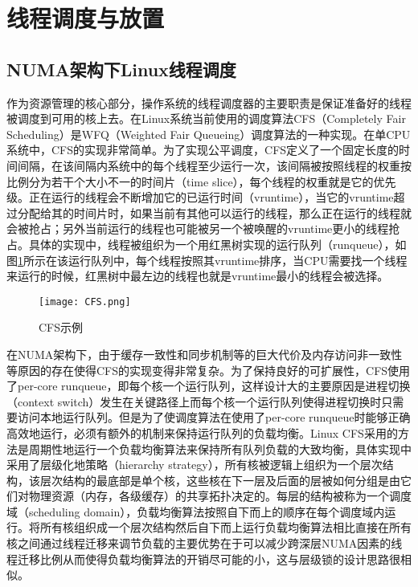 \section{线程调度与放置}
\subsection{NUMA架构下Linux线程调度}
作为资源管理的核心部分，操作系统的线程调度器的主要职责是保证准备好的线程被调度到可用的核上去。在Linux系统当前使用的调度算法CFS（Completely Fair Scheduling）\cite{lozi2016linux}是WFQ（Weighted Fair Queueing）调度算法的一种实现。在单CPU系统中，CFS的实现非常简单。为了实现公平调度，CFS定义了一个固定长度的时间间隔，在该间隔内系统中的每个线程至少运行一次，该间隔被按照线程的权重按比例分为若干个大小不一的时间片（time slice），每个线程的权重就是它的优先级。正在运行的线程会不断增加它的已运行时间（vruntime），当它的vruntime超过分配给其的时间片时，如果当前有其他可以运行的线程，那么正在运行的线程就会被抢占；另外当前运行的线程也可能被另一个被唤醒的vruntime更小的线程抢占。具体的实现中，线程被组织为一个用红黑树实现的运行队列（runqueue），如图\ref{Fig:CFS}所示在该运行队列中，每个线程按照其vruntime排序，当CPU需要找一个线程来运行的时候，红黑树中最左边的线程也就是vruntime最小的线程会被选择。

\begin{figure}[t]
	\centering
	\texttt{[image: CFS.png]}
	\caption{CFS示例}
	\label{Fig:CFS}
\end{figure}

在NUMA架构下，由于缓存一致性和同步机制等的巨大代价及内存访问非一致性等原因的存在使得CFS的实现变得非常复杂。为了保持良好的可扩展性，CFS使用了per-core runqueue，即每个核一个运行队列，这样设计大的主要原因是进程切换（context switch）发生在关键路径上而每个核一个运行队列使得进程切换时只需要访问本地运行队列。但是为了使调度算法在使用了per-core runqueue时能够正确高效地运行，必须有额外的机制来保持运行队列的负载均衡。Linux CFS采用的方法是周期性地运行一个负载均衡算法来保持所有队列负载的大致均衡，具体实现中采用了层级化地策略（hierarchy strategy），所有核被逻辑上组织为一个层次结构，该层次结构的最底部是单个核，这些核在下一层及后面的层被如何分组是由它们对物理资源（内存，各级缓存）的共享拓扑决定的。每层的结构被称为一个调度域（scheduling domain），负载均衡算法按照自下而上的顺序在每个调度域内运行。将所有核组织成一个层次结构然后自下而上运行负载均衡算法相比直接在所有核之间通过线程迁移来调节负载的主要优势在于可以减少跨深层NUMA因素的线程迁移比例从而使得负载均衡算法的开销尽可能的小，这与层级锁的设计思路很相似。

